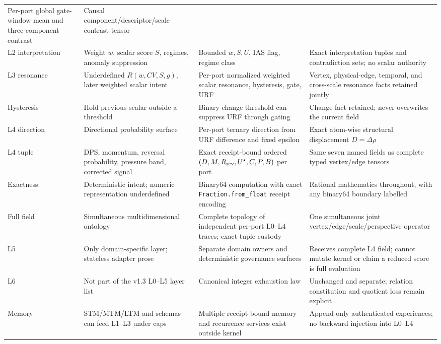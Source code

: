 \documentclass[11pt,oneside]{article}
\begin{document}
\begin{longtable}{
>{\raggedright\arraybackslash}p{}
>{\raggedright\arraybackslash}p{}
>{\raggedright\arraybackslash}p{}
>{\raggedright\arraybackslash}p{}}
Per-port global gate-window mean and three-component contrast &
Causal component/descriptor/scale contrast tensor\\
\addlinespace
L2 interpretation &
Weight \(w\), scalar score \(S\), regimes, anomaly suppression &
Bounded \(w,S,U\), IAS flag, regime class &
Exact interpretation tuples and contradiction sets; no scalar authority\\
\addlinespace
L3 resonance &
Underdefined \(R(w,CV,S,g)\), later weighted scalar intent &
Per-port normalized weighted scalar resonance, hysteresis, gate, URF &
Vertex, physical-edge, temporal, and cross-scale resonance facts retained
jointly\\
\addlinespace
Hysteresis &
Hold previous scalar outside a threshold &
Binary change threshold can suppress URF through gating &
Change fact retained; never overwrites the current field\\
\addlinespace
L4 direction &
Directional probability surface &
Per-port ternary direction from URF difference and fixed epsilon &
Exact atom-wise structural displacement \(D=\Delta\rho\)\\
\addlinespace
L4 tuple &
DPS, momentum, reversal probability, pressure band, corrected signal &
Exact receipt-bound ordered
\((D,M,R_{\rm rev},U^\star,C,P,B)\) per port &
Same seven named fields as complete typed vertex/edge tensors\\
\addlinespace
Exactness &
Deterministic intent; numeric representation underdefined &
Binary64 computation with exact \texttt{Fraction.from\_float} receipt encoding &
Rational mathematics throughout, with any binary64 boundary labelled\\
\addlinespace
Full field &
Simultaneous multidimensional ontology &
Complete topology of independent per-port L0--L4 traces; exact tuple custody &
One simultaneous joint vertex/edge/scale/perspective operator\\
\addlinespace
L5 &
Only domain-specific layer; stateless adapter prose &
Separate domain owners and deterministic governance surfaces &
Receives complete L4 field; cannot mutate kernel or claim a reduced score is
full evaluation\\
\addlinespace
L6 &
Not part of the v1.3 L0--L5 layer list &
Canonical integer exhaustion law &
Unchanged and separate; relation constitution and quotient loss remain explicit\\
\addlinespace
Memory &
STM/MTM/LTM and schemas can feed L1--L3 under caps &
Multiple receipt-bound memory and recurrence services exist outside kernel &
Append-only authenticated experiences; no backward injection into L0--L4\\

\end{longtable}
\end{document}
